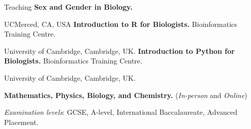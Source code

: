 \begin{rubric}{Teaching}
 \entry*[Fall 2023]%
	\textbf{Sex and Gender in Biology.} \par UCMerced, CA, USA
\entry*[2018-2020]%
	\textbf{Introduction to R for Biologists.} Bioinformatics Training Centre. \par University of Cambridge, Cambridge, UK.
 \entry*[2018-2020]%
	\textbf{Introduction to Python for Biologists.} Bioinformatics Training Centre. \par University of Cambridge, Cambridge, UK.


 \entry*[2014--2022]%
	\textbf{Mathematics, Physics, Biology, and Chemistry.} (\emph{In-person} and \emph{Online}) \par
\textit{Examination levels}: GCSE,  A-level, International Baccalaureate, Advanced Placement. 
%
\end{rubric}